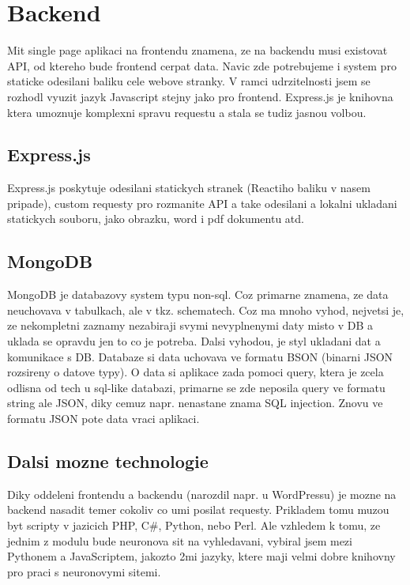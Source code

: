 \section{Backend}
Mit single page aplikaci na frontendu znamena, ze na backendu musi existovat API,
od ktereho bude frontend cerpat data.
Navic zde potrebujeme i system pro staticke odesilani baliku cele webove stranky.
V ramci udrzitelnosti jsem se rozhodl vyuzit jazyk Javascript stejny jako pro frontend.
Express.js je knihovna ktera umoznuje komplexni spravu requestu a
stala se tudiz jasnou volbou.

\subsection{Express.js}
Express.js poskytuje odesilani statickych stranek (Reactiho baliku v nasem pripade),
custom requesty pro rozmanite API a take odesilani a lokalni ukladani statickych souboru,
jako obrazku, word i pdf dokumentu atd.

\subsection{MongoDB}
MongoDB je databazovy system typu non-sql.
Coz primarne znamena, ze data neuchovava v tabulkach, ale v tkz. schematech.
Coz ma mnoho vyhod, nejvetsi je, ze nekompletni zaznamy nezabiraji
svymi nevyplnenymi daty misto v DB a uklada se opravdu jen to co je potreba.
Dalsi vyhodou, je styl ukladani dat a komunikace s DB.
Databaze si data uchovava ve formatu BSON (binarni JSON rozsireny o datove typy).
O data si aplikace zada pomoci query,
ktera je zcela odlisna od tech u sql-like databazi,
primarne se zde neposila query ve formatu string ale JSON,
diky cemuz napr. nenastane znama SQL injection.
Znovu ve formatu JSON pote data vraci aplikaci.

\subsection{Dalsi mozne technologie}
Diky oddeleni frontendu a backendu (narozdil napr. u WordPressu) je mozne
na backend nasadit temer cokoliv co umi posilat requesty.
Prikladem tomu muzou byt scripty v jazicich PHP, C\#, Python, nebo Perl.
Ale vzhledem k tomu, ze jednim z modulu bude neuronova sit na vyhledavani,
vybiral jsem mezi Pythonem a JavaScriptem, jakozto 2mi jazyky, ktere
maji velmi dobre knihovny pro praci s neuronovymi sitemi.

